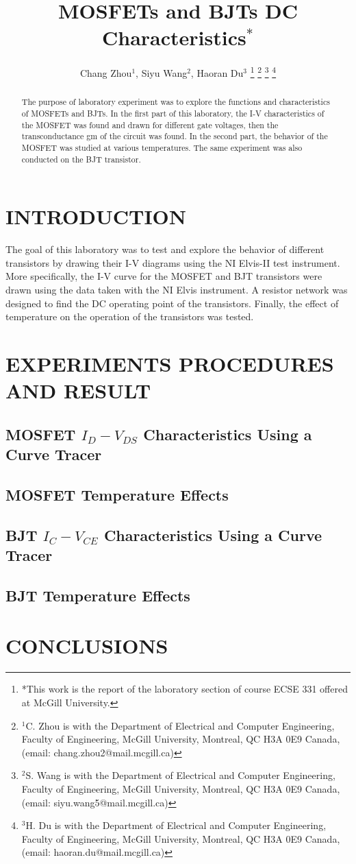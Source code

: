 \documentclass[letterpaper, 10 pt, conference]{ieeeconf}  %
\title{\Huge MOSFETs and BJTs DC Characteristics$^{*}$}
\author{Chang Zhou$^{1}$, Siyu Wang$^{2}$, Haoran Du$^{3}$%
\thanks{*This work is the report of the laboratory section of course ECSE 331 offered at McGill University.}%
\thanks{$^{1}$C. Zhou is with the Department of Electrical and Computer
Engineering, Faculty of Engineering, McGill University, Montreal, QC H3A 0E9 Canada,
(email: chang.zhou2@mail.mcgill.ca)}%
\thanks{$^{2}$S. Wang is with the Department of Electrical and Computer
Engineering, Faculty of Engineering, McGill University, Montreal, QC H3A 0E9 Canada,
(email: siyu.wang5@mail.mcgill.ca)}%
\thanks{$^{3}$H. Du is with the Department of Electrical and Computer
Engineering, Faculty of Engineering, McGill University, Montreal, QC H3A 0E9 Canada,
(email: haoran.du@mail.mcgill.ca)}%
}
\begin{document}

\maketitle
\thispagestyle{fancy}
\pagestyle{fancy}
\setcounter{page}{1}
\fancyhf{} %
\renewcommand{\headrulewidth}{0pt} %
\rhead{\thepage}

\begin{abstract}
The purpose of laboratory experiment was to explore the functions
and characteristics of MOSFETs and BJTs. In the first part of this laboratory,
the I-V characteristics of the MOSFET was found and drawn for different gate voltages,
then the transconductance gm of the circuit was found. In the second part,
the behavior of the MOSFET was studied at various temperatures.
The same experiment was also conducted on the BJT transistor.
\end{abstract}

\section{INTRODUCTION}
\par The goal of this laboratory was to test and explore the behavior of
 different transistors by drawing their I-V diagrams using the NI Elvis-II test instrument.
 More specifically, the I-V curve for the MOSFET and BJT transistors were drawn
 using the data taken with the NI Elvis instrument. A resistor network was designed
 to find the DC operating point of the transistors.
 Finally, the effect of temperature on the operation of the transistors was tested.
\section{EXPERIMENTS PROCEDURES AND RESULT}
\subsection{MOSFET $I_{D}-V_{DS}$ Characteristics Using a Curve Tracer}
\subsection{MOSFET Temperature Effects}
\subsection{BJT $I_{C}-V_{CE}$ Characteristics Using a Curve Tracer}
\subsection{BJT Temperature Effects}




\section{CONCLUSIONS}
\end{document}
